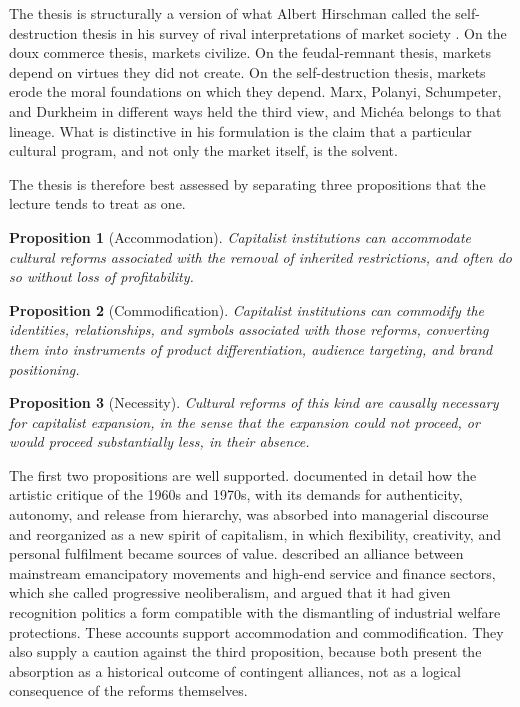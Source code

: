 \documentclass[12pt]{article}
\newtheorem{proposition}{Proposition}[section]
\begin{document}
The thesis is structurally a version of what Albert Hirschman called the self-destruction thesis in his survey of rival interpretations of market society \citep{hirschman82}. On the doux commerce thesis, markets civilize. On the feudal-remnant thesis, markets depend on virtues they did not create. On the self-destruction thesis, markets erode the moral foundations on which they depend. Marx, Polanyi, Schumpeter, and Durkheim in different ways held the third view, and Michéa belongs to that lineage. What is distinctive in his formulation is the claim that a particular cultural program, and not only the market itself, is the solvent.

The thesis is therefore best assessed by separating three propositions that the lecture tends to treat as one.

\begin{proposition}[Accommodation]
Capitalist institutions can accommodate cultural reforms associated with the removal of inherited restrictions, and often do so without loss of profitability.
\end{proposition}

\begin{proposition}[Commodification]
Capitalist institutions can commodify the identities, relationships, and symbols associated with those reforms, converting them into instruments of product differentiation, audience targeting, and brand positioning.
\end{proposition}

\begin{proposition}[Necessity]
Cultural reforms of this kind are causally necessary for capitalist expansion, in the sense that the expansion could not proceed, or would proceed substantially less, in their absence.
\end{proposition}

The first two propositions are well supported. \citet{boltanski} documented in detail how the artistic critique of the 1960s and 1970s, with its demands for authenticity, autonomy, and release from hierarchy, was absorbed into managerial discourse and reorganized as a new spirit of capitalism, in which flexibility, creativity, and personal fulfilment became sources of value. \citet{fraser2017} described an alliance between mainstream emancipatory movements and high-end service and finance sectors, which she called progressive neoliberalism, and argued that it had given recognition politics a form compatible with the dismantling of industrial welfare protections. These accounts support accommodation and commodification. They also supply a caution against the third proposition, because both present the absorption as a historical outcome of contingent alliances, not as a logical consequence of the reforms themselves.
\end{document}

